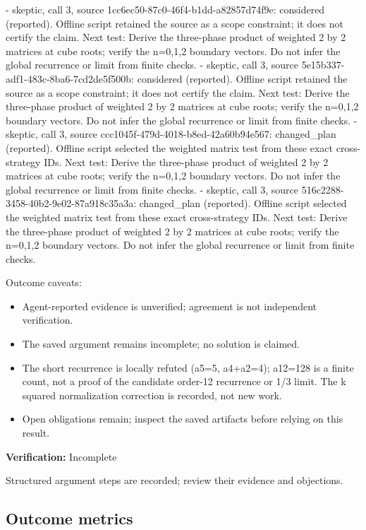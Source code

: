 \documentclass[11pt]{article}
\begin{document}
- skeptic, call 3, source 1cc6ec50-87c0-46f4-b1dd-a82857d74f9e: considered (reported). Offline script retained the source as a scope constraint; it does not certify the claim. Next test: Derive the three-phase product of weighted 2 by 2 matrices at cube roots; verify the n=0,1,2 boundary vectors. Do not infer the global recurrence or limit from finite checks.
- skeptic, call 3, source 5e15b337-adf1-483c-8ba6-7cd2de5f500b: considered (reported). Offline script retained the source as a scope constraint; it does not certify the claim. Next test: Derive the three-phase product of weighted 2 by 2 matrices at cube roots; verify the n=0,1,2 boundary vectors. Do not infer the global recurrence or limit from finite checks.
- skeptic, call 3, source ccc1045f-479d-4018-b8ed-42a60b94e567: changed\_plan (reported). Offline script selected the weighted matrix test from these exact cross-strategy IDs. Next test: Derive the three-phase product of weighted 2 by 2 matrices at cube roots; verify the n=0,1,2 boundary vectors. Do not infer the global recurrence or limit from finite checks.
- skeptic, call 3, source 516c2288-3458-40b2-9e02-87a918c35a3a: changed\_plan (reported). Offline script selected the weighted matrix test from these exact cross-strategy IDs. Next test: Derive the three-phase product of weighted 2 by 2 matrices at cube roots; verify the n=0,1,2 boundary vectors. Do not infer the global recurrence or limit from finite checks.\par
Outcome caveats:\par
\begin{itemize}
\item Agent-reported evidence is unverified; agreement is not independent verification.
\item The saved argument remains incomplete; no solution is claimed.
\item The short recurrence is locally refuted (a5=5, a4+a2=4); a12=128 is a finite count, not a proof of the candidate order-12 recurrence or 1/3 limit. The k squared normalization correction is recorded, not new work.
\item Open obligations remain; inspect the saved artifacts before relying on this result.
\end{itemize}
\textbf{Verification:} Incomplete\par
Structured argument steps are recorded; review their evidence and objections.\par
\subsection{Outcome metrics}
\end{document}
